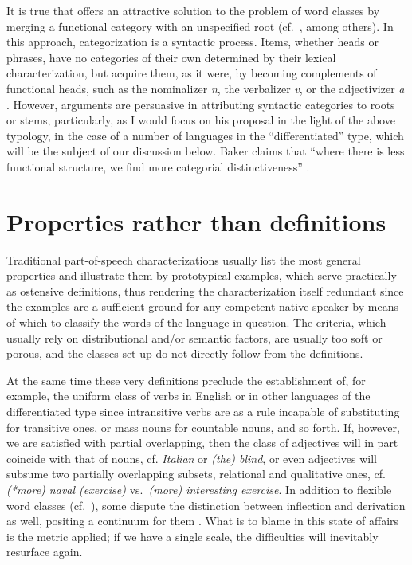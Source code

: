 \documentclass[output=paper]{langsci/langscibook}
\begin{document}
It is true that  offers an attractive solution to
the problem of word classes by merging a functional category with an
unspecified root (cf.\ \citealt{HalleMarantz1993,Marantz1997,Arad2003,Panagiotidis2015}, 
among others). In this approach,
categorization is a syntactic process. Items, whether
heads or phrases, have no categories of their own determined by their lexical
characterization, but acquire them, as it were, by becoming complements of
functional heads, such as the nominalizer \emph{n}, the verbalizer \emph{v}, or
the adjectivizer \emph{a} \parencite[17]{Panagiotidis2015}. However,
 arguments are persuasive in attributing syntactic
categories to roots or stems, particularly, as I would
focus on his proposal in the light of the above typology, in the case of a
number of languages in the \enquote{differentiated} type, which will be the
subject of our discussion below. Baker claims that “where there is less
functional structure, we find more categorial distinctiveness”
\parencite[268]{Baker2003}.

\section{Properties rather than definitions}\label{sec:27.2}

Traditional part-of-speech characterizations usually list the most general
properties and illustrate them by prototypical examples, which serve
practically as ostensive definitions, thus rendering the characterization
itself redundant since the examples are a sufficient ground for any competent
native speaker by means of which to classify the words of the language in
question. The criteria, which usually rely on distributional and/or semantic
factors, are usually too soft or porous, and the classes set up do not directly
follow from the definitions.

At the same time these very definitions preclude the establishment of, for
example, the uniform class of verbs in English or in other languages of the
differentiated type since intransitive verbs are as a rule incapable of
substituting for transitive ones, or mass nouns for countable nouns, and so
forth. If, however, we are satisfied with partial overlapping, then the class
of adjectives will in part coincide with that of nouns, cf. \emph{Italian} or
\emph{(the) blind}, or even adjectives will subsume two partially overlapping
subsets, relational and qualitative ones, cf. \emph{(*more) naval (exercise)}
vs.\ \emph{(more) interesting exercise}. In addition to flexible word classes
(cf.\ \citealt{RijkhoffvanLier2013}), some dispute the distinction between
inflection and derivation as well, positing a continuum for them
\citep{Dressler1989}. What is to blame in this state of affairs is the metric
applied; if we have a single scale, the difficulties will inevitably resurface
again.
\end{document}
